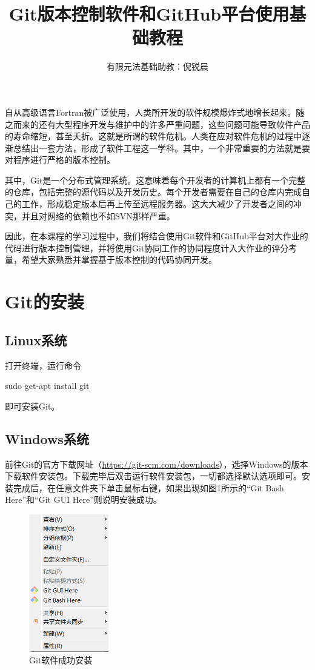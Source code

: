\documentclass[a4paper,14pt]{article}
\title{Git版本控制软件和GitHub平台使用基础教程}
\author{有限元法基础助教：倪锐晨}
\begin{document}
\maketitle

自从高级语言Fortran被广泛使用，人类所开发的软件规模爆炸式地增长起来。随之而来的还有大型程序开发与维护中的许多严重问题，这些问题可能导致软件产品的寿命缩短，甚至夭折。这就是所谓的软件危机。人类在应对软件危机的过程中逐渐总结出一套方法，形成了软件工程这一学科。其中，一个非常重要的方法就是要对程序进行严格的版本控制。

其中，Git是一个分布式管理系统。这意味着每个开发者的计算机上都有一个完整的仓库，包括完整的源代码以及开发历史。每个开发者需要在自己的仓库内完成自己的工作，形成稳定版本后再上传至远程服务器。这大大减少了开发者之间的冲突，并且对网络的依赖也不如SVN那样严重。

因此，在本课程的学习过程中，我们将结合使用Git软件和GitHub平台对大作业的代码进行版本控制管理，并将使用Git协同工作的协同程度计入大作业的评分考量，希望大家熟悉并掌握基于版本控制的代码协同开发。

\section{Git的安装}
\subsection*{Linux系统}
打开终端，运行命令

sudo get-apt install git

即可安装Git。
\subsection*{Windows系统}
前往Git的官方下载网址（\url{https://git-scm.com/downloads}），选择Windows的版本下载软件安装包。下载完毕后双击运行软件安装包，一切都选择默认选项即可。安装完成后，在任意文件夹下单击鼠标右键，如果出现如图1所示的“Git Bash Here”和“Git GUI Here”则说明安装成功。
\begin{figure}[h]
\centering
\includegraphics[height=6cm]{figure/Git_Success}
\caption{Git软件成功安装}
\end{figure}
\end{document}
